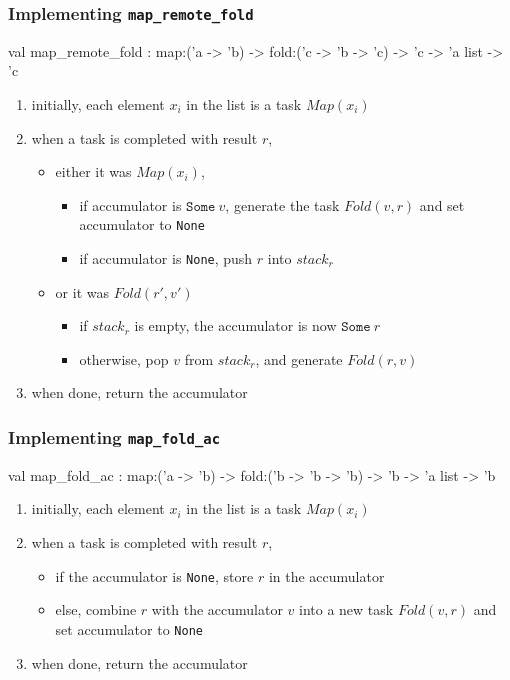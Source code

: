 \documentclass{beamer}
\begin{document}
\begin{frame}\frametitle{Implementing \texttt{map\_remote\_fold}}
  \begin{ocaml}
val map_remote_fold :
  map:('a -> 'b) -> fold:('c -> 'b -> 'c) -> 
  'c -> 'a list -> 'c
  \end{ocaml}



  \begin{enumerate}
  \item initially, each element $x_i$ in the list is a task $Map(x_i)$
  \item when a task is completed with result $r$,
    \begin{itemize}
    \item either it was $Map(x_i)$,
      \begin{itemize}
      \item if accumulator is $\texttt{Some}~v$, generate the task
        $Fold(v,r)$ and set accumulator to \texttt{None}
      \item if accumulator is \texttt{None}, push $r$ into $\mathit{stack}_r$
      \end{itemize}
    \item or it was $Fold(r',v')$
      \begin{itemize}
      \item if $\mathit{stack}_r$ is empty, the accumulator is now
        $\texttt{Some}~r$ 
      \item otherwise, pop $v$ from $\mathit{stack}_r$, and generate
        $Fold(r,v)$ 
      \end{itemize}
    \end{itemize}
  \item when done, return the accumulator
  \end{enumerate}
\end{frame}

\begin{frame}\frametitle{Implementing \texttt{map\_fold\_ac}}
  \begin{ocaml}
val map_fold_ac :
  map:('a -> 'b) -> fold:('b -> 'b -> 'b) -> 
  'b -> 'a list -> 'b
  \end{ocaml}



  \begin{enumerate}
  \item initially, each element $x_i$ in the list is a task $Map(x_i)$
  \item when a task is completed with result $r$,
    \begin{itemize}
    \item if the accumulator is \texttt{None}, store $r$ in the accumulator
    \item else, combine $r$ with the accumulator $v$ into a new task
      $Fold(v, r)$ and set accumulator to \texttt{None}
    \end{itemize}
  \item when done, return the accumulator
  \end{enumerate}
\end{frame}
\end{document}
